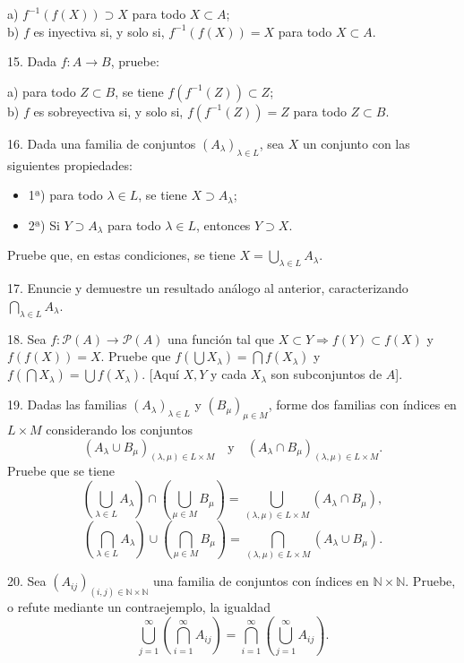 \documentclass[12pt,oneside]{book}
\begin{document}
a) \(f^{-1}(f(X)) \supset X\) para todo \(X \subset A\);\\
b) \(f\) es inyectiva si, y solo si, \(f^{-1}(f(X)) = X\) para todo \(X \subset A\).

15. Dada \(f: A \to B\), pruebe:

a) para todo \(Z \subset B\), se tiene \(f(f^{-1}(Z)) \subset Z\);\\
b) \(f\) es sobreyectiva si, y solo si, \(f(f^{-1}(Z)) = Z\) para todo \(Z \subset B\).

16. Dada una familia de conjuntos \((A_\lambda)_{\lambda \in L}\), sea \(X\) un conjunto con las siguientes propiedades:

\begin{itemize}
\item[] 1ª) para todo \(\lambda \in L\), se tiene \(X \supset A_\lambda\);

\item[] 2ª) Si \(Y \supset A_\lambda\) para todo \(\lambda \in L\), entonces \(Y \supset X\).
\end{itemize}

Pruebe que, en estas condiciones, se tiene \(X = \bigcup_{\lambda \in L} A_\lambda\).

17. Enuncie y demuestre un resultado análogo al anterior, caracterizando \(\bigcap_{\lambda \in L} A_\lambda\).

18. Sea \(f: \mathcal{P}(A) \to \mathcal{P}(A)\) una función tal que \(X \subset Y \Rightarrow f(Y) \subset f(X)\) y \(f(f(X)) = X\). Pruebe que \(f(\bigcup X_\lambda) = \bigcap f(X_\lambda)\) y \(f(\bigcap X_\lambda) = \bigcup f(X_\lambda)\). [Aquí \(X, Y\) y cada \(X_\lambda\) son subconjuntos de \(A\)].

19. Dadas las familias \((A_\lambda)_{\lambda \in L}\) y \((B_\mu)_{\mu \in M}\), forme dos familias con índices en \(L \times M\) considerando los conjuntos
\[
(A_\lambda \cup B_\mu)_{(\lambda, \mu) \in L \times M} \quad \text{y} \quad (A_\lambda \cap B_\mu)_{(\lambda, \mu) \in L \times M}.
\]
Pruebe que se tiene
\[
\left( \bigcup_{\lambda \in L} A_\lambda \right) \cap \left( \bigcup_{\mu \in M} B_\mu \right) = \bigcup_{(\lambda,\mu) \in L \times M} (A_\lambda \cap B_\mu),
\]
\[
\left( \bigcap_{\lambda \in L} A_\lambda \right) \cup \left( \bigcap_{\mu \in M} B_\mu \right) = \bigcap_{(\lambda,\mu) \in L \times M} (A_\lambda \cup B_\mu).
\]

20. Sea \((A_{ij})_{(i,j) \in \mathbb{N} \times \mathbb{N}}\) una familia de conjuntos con índices en \(\mathbb{N} \times \mathbb{N}\). Pruebe, o refute mediante un contraejemplo, la igualdad
\[
\bigcup_{j=1}^{\infty} \left( \bigcap_{i=1}^{\infty} A_{ij} \right) = \bigcap_{i=1}^{\infty} \left( \bigcup_{j=1}^{\infty} A_{ij} \right).
\]
\end{document}
